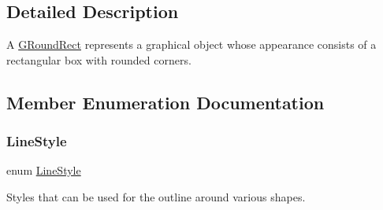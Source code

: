 \subsection{Detailed Description}
A \mbox{\hyperlink{classsgl_1_1GRoundRect}{G\+Round\+Rect}} represents a graphical object whose appearance consists of a rectangular box with rounded corners. 

\subsection{Member Enumeration Documentation}
\mbox{\label{classsgl_1_1GObject_a86e0f5648542856159bb40775c854aa7}} 
\subsubsection{\texorpdfstring{Line\+Style}{LineStyle}}
{\footnotesize\ttfamily enum \mbox{\hyperlink{classsgl_1_1GObject_a86e0f5648542856159bb40775c854aa7}{Line\+Style}}\hspace{0.3cm}{\ttfamily [inherited]}}



Styles that can be used for the outline around various shapes. 

